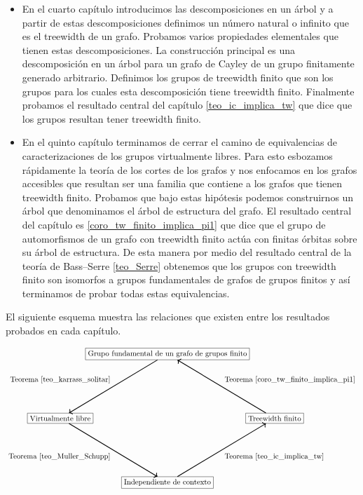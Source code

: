 \documentclass[tesis.tex]{subfiles}
\begin{document}
\begin{itemize}
		\item 
			En el cuarto capítulo introducimos las descomposiciones en un árbol y a partir de estas descomposiciones definimos un número natural o infinito que es el treewidth de un grafo.
			Probamos varios propiedades elementales que tienen estas descomposiciones. 
			La construcción principal es una descomposición en un árbol para un grafo de Cayley de un grupo finitamente generado arbitrario.
			Definimos los grupos de treewidth finito que son los grupos para los cuales esta descomposición tiene treewidth finito.
			Finalmente probamos el resultado central del capítulo \ref{teo_ic_implica_tw} que dice que los grupos \ic resultan tener treewidth finito.
			
		\item 
			En el quinto capítulo terminamos de cerrar el camino de equivalencias de caracterizaciones de los grupos virtualmente libres.
			Para esto esbozamos rápidamente la teoría de los cortes de los grafos y nos enfocamos en los grafos accesibles que resultan ser una familia que contiene a los grafos que tienen treewidth finito.
			Probamos que bajo estas hipótesis podemos construirnos un árbol que denominamos el árbol de estructura del grafo.
			El resultado central del capítulo es \ref{coro_tw_finito_implica_pi1} que dice que el grupo de automorfismos de un grafo con treewidth finito actúa con finitas órbitas sobre su árbol de estructura. 
			De esta manera por medio del resultado central de la teoría de Bass--Serre  \ref{teo_Serre} obtenemos que los grupos con treewidth finito son isomorfos a grupos fundamentales de grafos de grupos finitos y así terminamos de probar todas estas equivalencias.
	\end{itemize}
		
	
	
	
	El siguiente esquema muestra las relaciones que existen entre los resultados probados en cada capítulo.
	
	\[	
	\begin{tikzpicture}
		\path 
		(0,0) node(a) [rectangle,draw] {Grupo fundamental de un grafo de grupos finito}
		(5,-3) node(b) [rectangle,draw] {Treewidth finito}
		(0,-6) node(c) [rectangle,draw] {Independiente de contexto}
		(-5,-3) node (d) [rectangle,draw] {Virtualmente libre};
		\draw   
		(d) edge[<-,line width=1.0pt,"Teorema \ref{teo_karrass_solitar}"] (a) 
		(c) edge[<-,line width=1.0pt,"Teorema \ref{teo_Muller_Schupp}"] (d)
		(b) edge[<-,line width=1.0pt,"Teorema \ref{teo_ic_implica_tw}"] (c)
		(a)  edge[<-,line width=1.0pt,"Teorema \ref{coro_tw_finito_implica_pi1}"] (b);
	\end{tikzpicture}
	\]
	
	
	
	
	
	
	
\end{document}
